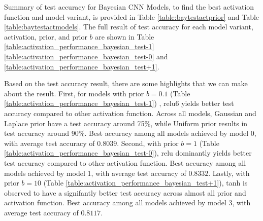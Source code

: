 \documentclass[ %
                    author={Revalda Putawara},
                supervisor={Dr. James Pope},
                    degree={MSc},
                     title={Robustness of Bayesian Neural Networks Design Choices Against Weight and Bias Perturbation Induced by Single Event Upsets (SEUs)},
                      type={},
                      year={2025}]{dissertation}
\begin{document}

Summary of test accuracy for Bayesian CNN Models, to find the best activation function and model variant, is provided in Table \ref{table:baytestactprior} and Table \ref{table:baytestactmodels}. The full result of test accuracy for each model variant, activation, prior, and prior $b$ are shown in Table \ref{table:activation_performance_bayesian_test-1} \ref{table:activation_performance_bayesian_test-0} and \ref{table:activation_performance_bayesian_test+1}.

Based on the test accuracy result, there are some highlights that we can make about the result. First, for models with prior $b=0.1$ (Table \ref{table:activation_performance_bayesian_test-1}) , relu6 yields better test accuracy compared to other activation function. Across all models, Gaussian and Laplace prior have a test accuracy around 75\%, while Uniform prior results in test accuracy around 90\%. Best accuracy among all models achieved by model 0, with average test accuracy of $0.8039$. Second, with prior $b=1$ (Table \ref{table:activation_performance_bayesian_test-0}), relu dominantly yields better test accuracy compared to other activation function. Best accuracy among all models achieved by model 1, with average test accuracy of $0.8332$. Lastly, with prior $b=10$ (Table \ref{table:activation_performance_bayesian_test+1}), tanh is observed to have a signifantly better test accuracy across almost all prior and activation function. Best accuracy among all models achieved by model 3, with average test accuracy of $0.8117$.
\end{document}
